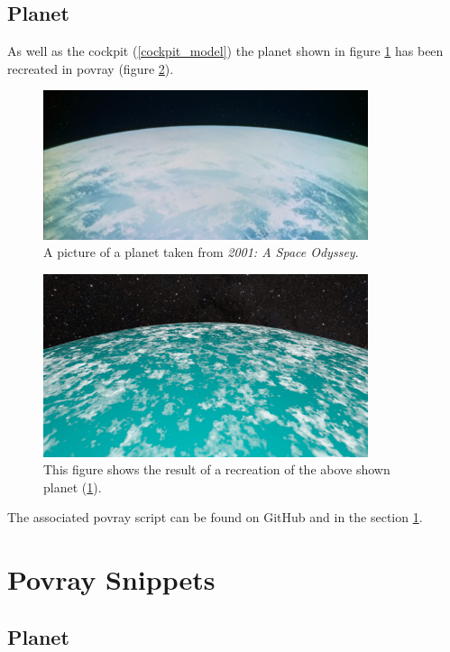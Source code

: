 \subsection{Planet}
As well as the cockpit (\ref{cockpit_model}) the planet shown in figure \ref{planet_original} has been recreated in povray (figure \ref{planet_povray}).
\begin{figure}[ht]
	\centering
	\includegraphics[width=0.85\textwidth]{images/original_planet.png}
	\caption{A picture of a planet taken from \textit{2001: A Space Odyssey}.}
	\label{planet_original}
\end{figure}

\begin{figure}[ht]
	\centering
	\includegraphics[width=0.85\textwidth]{images/scene04_05.jpg}
	\caption{This figure shows the result of a recreation of the above shown planet (\ref{planet_original}).}
	\label{planet_povray}
\end{figure}

The associated povray script can be found on GitHub \cite{Quving} and in the section \ref{povray_snippets}.

\newpage
\section{Povray Snippets} \label{povray_snippets}

\subsection{Planet}

